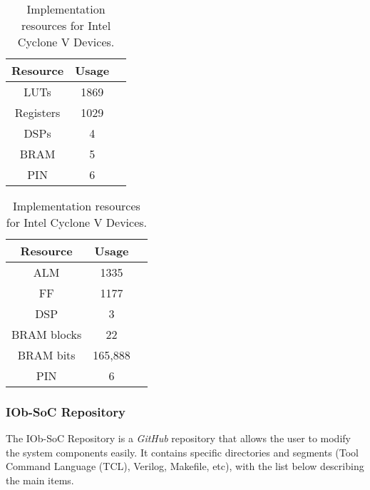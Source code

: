 \begin{table}[H]
\parbox{.45\linewidth}{
\centering
\begin{tabular}{|c|c|c|}
        \hline
         \textbf{Resource} & \textbf{Usage}  \\
         \hline
         LUTs & 1869 \\
         \hline
         Registers & 1029 \\
         \hline
         DSPs & 4 \\
         \hline
         BRAM & 5 \\
         \hline
         PIN & 6 \\
         \hline
\end{tabular}
\caption{Implementation resources for Xilinx Kintex
Ultrascale Devices.}
\label{tab:resorucesxilinx}
}
\hfill
\parbox{.45\linewidth}{
\centering
\begin{tabular}{|c|c|c|}
        \hline
         \textbf{Resource} & \textbf{Usage}  \\
         \hline
         ALM & 1335 \\
         \hline
         FF & 1177 \\
         \hline
         DSP & 3 \\
         \hline
         BRAM blocks & 22 \\
         \hline
         BRAM bits & 165,888 \\
         \hline
         PIN & 6 \\
         \hline
\end{tabular}
\caption{Implementation resources for Intel Cyclone
V Devices.}
\label{tab:resorucescyclone}
}
\end{table}


\subsubsection{IOb-SoC Repository}

The IOb-SoC Repository is a \textit{GitHub} repository that allows the user to modify the system components easily. It contains specific directories and segments (Tool Command Language (TCL), Verilog, Makefile, etc), with the list below describing the main items.

